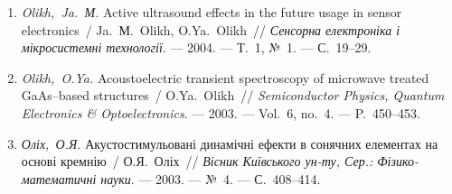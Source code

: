\begin{enumerate}[label=\arabic*.,leftmargin=1em,itemindent=1em]
\item
\emph{Olikh,~Ja.~М.} Active ultrasound effects in the future usage in
  sensor electronics~/ Ja.~М.~Olikh, O.Ya.~Olikh~// \emph{Сенсорна
  електроніка і мікросистемні технології}.
  ---
  2004. ---
  Т.~1, {№}~1. ---
  {С.}~19--29.

\item
\emph{Olikh,~O.Ya.} Acoustoelectric transient spectroscopy of microwave
  treated {G}a{A}s--based structures~/ O.Ya.~Olikh~// \emph{Semiconductor
  Physics, Quantum Electronics \& Optoelectronics}. ---
  2003. ---
  Vol.~6, no.~4. ---
  P.~450--453.

\item
\emph{Оліх,~О.Я.} Акустостимульовані
  динамічні ефекти в сонячних елементах на
  основі кремнію~/ О.Я.~Оліх~// \emph{Вісник
  Київського ун-ту, Сер.: Фізико-математичні
  науки}. ---
  2003. ---
  {№}~4. ---
  {С.}~408--414.
\end{enumerate}

